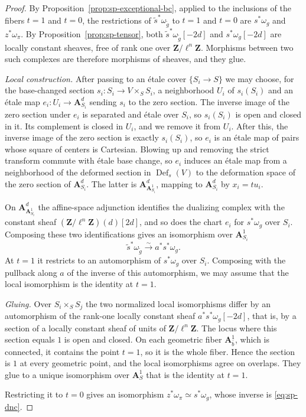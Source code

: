 \documentclass[11pt,a4paper]{article}
\numberwithin{equation}{section}
\theoremstyle{definition}
\theoremstyle{remark}
\begin{document}
\begin{proof}
By Proposition~\ref{prop:sp-exceptional-bc}, applied to the inclusions
of the fibers $t=1$ and $t=0$, the restrictions of
$\widetilde s^{*}\omega_{\widetilde g}$ to $t=1$ and $t=0$ are
$s^{*}\omega_{g}$ and $z^{*}\omega_{\pi}$. By Proposition~\ref{prop:sp-tensor}, both
$\widetilde s^{*}\omega_{\widetilde g}[-2d]$ and
$s^{*}\omega_{g}[-2d]$ are locally constant sheaves, free of rank one
over $\mathbf Z/\ell^n\mathbf Z$. Morphisms between two such complexes
are therefore morphisms of sheaves, and they glue.

\emph{Local construction.} After passing to an \'etale cover
$\{S_i\to S\}$ we may choose, for the base-changed section
$s_i:S_i\to V\times_SS_i$, a neighborhood $U_i$ of $s_i(S_i)$ and an
\'etale map $e_i:U_i\to\mathbf A^d_{S_i}$ sending $s_i$ to the zero
section. The inverse image of the zero section under $e_i$ is
separated and \'etale over $S_i$, so $s_i(S_i)$ is open and closed in
it. Its complement is closed in $U_i$, and we remove it from $U_i$.
After this, the inverse image of the zero section is exactly
$s_i(S_i)$, so $e_i$ is an \'etale map of pairs whose square of centers
is Cartesian. Blowing up and removing the strict transform commute
with \'etale base change, so $e_i$ induces an \'etale map from a
neighborhood of the deformed section in $\operatorname{Def}_s(V)$ to the
deformation space of the zero section of $\mathbf A^d_{S_i}$. The latter
is $\mathbf A^d_{\mathbf A^1_{S_i}}$, mapping to $\mathbf A^d_{S_i}$ by
$x_i=tu_i$.

On $\mathbf A^d_{\mathbf A^1_{S_i}}$ the affine-space adjunction
identifies the dualizing complex with the constant sheaf
$(\mathbf Z/\ell^n\mathbf Z)(d)[2d]$, and so does the chart $e_i$ for
$s^{*}\omega_{g}$ over $S_i$. Composing these two identifications
gives an isomorphism over $\mathbf A^1_{S_i}$
\[
 \widetilde s^{*}\omega_{\widetilde g}\xrightarrow{\sim}
 a^{*}s^{*}\omega_{g}.
\]
At $t=1$ it restricts to an automorphism of $s^{*}\omega_{g}$ over
$S_i$. Composing with the pullback along $a$ of the inverse of this
automorphism, we may assume that the local isomorphism is the identity
at $t=1$.

\emph{Gluing.} Over $S_i\times_SS_j$ the two normalized local
isomorphisms differ by an automorphism of the rank-one locally constant
sheaf $a^{*}s^{*}\omega_g[-2d]$, that is, by a section of a locally
constant sheaf of units of $\mathbf Z/\ell^n\mathbf Z$. The locus where
this section equals $1$ is open and closed. On each geometric fiber
$\mathbf A^1_{\bar b}$, which is connected, it contains the point $t=1$,
so it is the whole fiber. Hence the section is $1$ at every geometric
point, and the local isomorphisms agree on overlaps. They glue to a
unique isomorphism over $\mathbf A^1_S$ that is the identity at $t=1$.

Restricting it to $t=0$ gives an isomorphism
$z^{*}\omega_{\pi}\simeq s^{*}\omega_g$, whose inverse is
\eqref{eq:sp-dnc}.
\end{proof}
\end{document}
